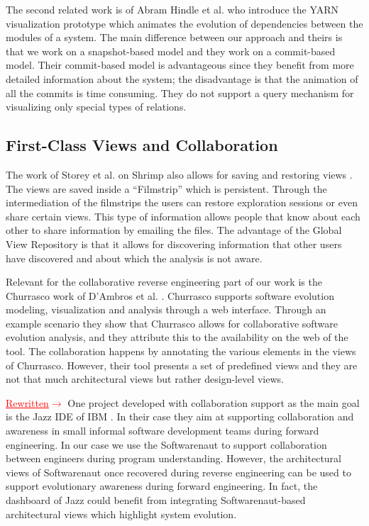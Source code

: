 \documentclass[preprint,12pt]{elsarticle}
\newcommand{\ra}{$\rightarrow$}
\newcommand{\rewritten}{\textcolor{red}{\uline{Rewritten}\ra\space }} %
\begin{document}
The second related work is of Abram Hindle et al. \cite{hindle-yarn} who introduce the YARN visualization prototype which animates the evolution of dependencies between the modules of a system. The main difference between our approach and theirs is that we work on a snapshot-based model and they work on a commit-based model. Their commit-based model is advantageous since they benefit from more detailed information about the system; the disadvantage is that the animation of all the commits is time consuming. They do not support a query mechanism for visualizing only special types of relations.


\subsection {First-Class Views and Collaboration} 

The work of Storey et al. on Shrimp also allows for saving and restoring views \cite{rayside-flow}. The views are saved inside a ``Filmstrip'' which is persistent. Through the intermediation of the filmstrips the users can restore exploration sessions or even share certain views. This type of information allows people that know about each other to share information by emailing the files. The advantage of the Global View Repository is that it allows for discovering information that other users have discovered and about which the analysis is not aware. 


Relevant for the collaborative reverse engineering part of our work is the Churrasco work of D’Ambros et al. \cite{dambros-churrasco}. Churrasco supports software evolution modeling, visualization and analysis through a web interface. 
Through an example scenario they show that Churrasco allows for collaborative software evolution analysis, and they attribute this to the availability on the web of the tool. The collaboration happens by annotating the various elements in the views of Churrasco. However, their tool presents a set of predefined views and they are not that much architectural views but rather design-level views. 

\rewritten
One project developed with collaboration support as the main goal is the Jazz IDE of IBM \cite{hupfer-jazz}. 
In their case they aim at supporting collaboration and awareness in small informal software development teams during forward engineering. In our case we use the Softwarenaut to support collaboration between engineers during program understanding. However, the architectural views of Softwarenaut once recovered during reverse engineering can be used to support evolutionary awareness during forward engineering. In fact, the dashboard of Jazz could benefit from integrating Softwarenaut-based architectural views which highlight system evolution.
\end{document}
